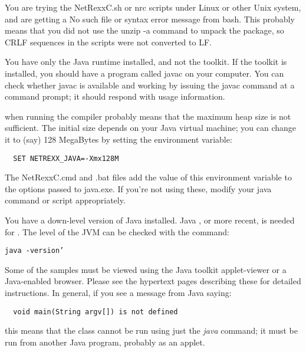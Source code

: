 \begin{description}
\item[No such file]  You are trying the NetRexxC.sh or nrc scripts under Linux or other Unix system, and are getting a No such file or syntax error message from bash. This probably means that you did not use the unzip -a command to unpack the \nr{} package, so CRLF sequences in the scripts were not converted to LF.
\item You have only the Java runtime installed, and not the toolkit. If the toolkit is installed, you should have a program called javac on your computer. You can check whether javac is available and working by issuing the javac command at a command prompt; it should respond with usage information.
\item[java.lang.OutOfMemoryError] when running the compiler probably means that the maximum heap size is not sufficient. The initial size depends on your Java virtual machine; you can change it to (say) 128 MegaBytes by setting the environment variable:
\begin{verbatim}
  SET NETREXX_JAVA=-Xmx128M
\end{verbatim}
The NetRexxC.cmd and .bat files add the value of this environment variable to the options passed to java.exe. If you're not using these, modify your java command or script appropriately.
\item[Down-level Java]  You have a down-level version of Java installed. Java \minimalJVMversion{}, or more recent, is needed for \nr{}. The level of the JVM can be checked with the command:
\begin{verbatim}
java -version’
\end{verbatim}
\item[applet viewer needed] Some of the samples must be viewed using the Java toolkit applet-viewer or a Java-enabled browser. Please see the hypertext pages describing these for detailed instructions. In general, if you see a message from Java saying:
\begin{verbatim}
  void main(String argv[]) is not defined
\end{verbatim}
this means that the class cannot be run using just the \emph{java} command; it must be run from another Java program, probably as an applet.
\end{description} 